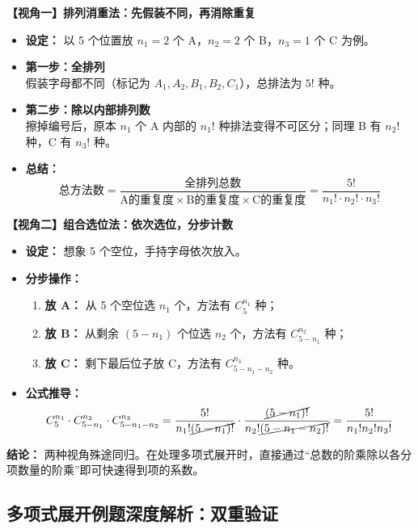 \documentclass[11pt,a4paper]{article}
\newlength{\myspace}             %
\begin{document}
\noindent \textbf{【视角一】排列消重法：先假装不同，再消除重复}
\begin{itemize}
    \item \textbf{设定：} 以 5 个位置放 $n_1=2$ 个 A，$n_2=2$ 个 B，$n_3=1$ 个 C 为例。
    \item \textbf{第一步：全排列} \\
    假装字母都不同（标记为 $A_1, A_2, B_1, B_2, C_1$），总排法为 $5!$ 种。
    \item \textbf{第二步：除以内部排列数} \\
    擦掉编号后，原本 $n_1$ 个 A 内部的 $n_1!$ 种排法变得不可区分；同理 B 有 $n_2!$ 种，C 有 $n_3!$ 种。
    \item \textbf{总结：}
    \[ \text{总方法数} = \frac{\text{全排列总数}}{\text{A的重复度} \times \text{B的重复度} \times \text{C的重复度}} = \frac{5!}{n_1! \cdot n_2! \cdot n_3!} \]
\end{itemize}

\vspace{\myspace}

\noindent \textbf{【视角二】组合选位法：依次选位，分步计数}
\begin{itemize}
    \item \textbf{设定：} 想象 5 个空位，手持字母依次放入。
    \item \textbf{分步操作：}
    \begin{enumerate}[label=\small\arabic*)]
        \item \textbf{放 A：} 从 5 个空位选 $n_1$ 个，方法有 $C_5^{n_1}$ 种；
        \item \textbf{放 B：} 从剩余 $(5-n_1)$ 个位选 $n_2$ 个，方法有 $C_{5-n_1}^{n_2}$ 种；
        \item \textbf{放 C：} 剩下最后位子放 C，方法有 $C_{5-n_1-n_2}^{n_3}$ 种。
    \end{enumerate}
    \item \textbf{公式推导：}
    \[ C_5^{n_1} \cdot C_{5-n_1}^{n_2} \cdot C_{5-n_1-n_2}^{n_3} = \frac{5!}{n_1!\cancel{(5-n_1)!}} \cdot \frac{\cancel{(5-n_1)!}}{n_2!\cancel{(5-n_1-n_2)!}}= \frac{5!}{n_1! n_2! n_3!} \]
\end{itemize}


\begin{mybox}{\textbf{结论：}}
 两种视角殊途同归。在处理多项式展开时，直接通过“总数的阶乘除以各分项数量的阶乘”即可快速得到项的系数。
\end{mybox}


\subsection{多项式展开例题深度解析：双重验证}
\end{document}
